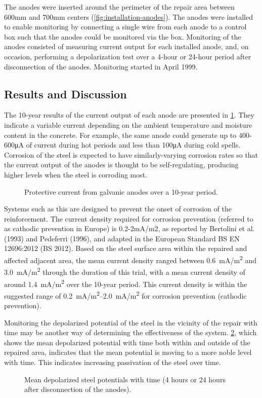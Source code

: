 The anodes were inserted around the perimeter of the repair area between 600mm and 700mm centers (\cref{fig:installation-anodes}). The anodes were installed to enable monitoring by connecting a single wire from each anode to a control box such that the anodes could be monitored via the box. Monitoring of the anodes consisted of measuring current output for each installed anode, and, on occasion, performing a depolarization test over a 4-hour or 24-hour period after disconnection of the anodes. Monitoring started in April 1999.


\subsection{Results and Discussion}
The 10-year results of the current output of each anode are presented in \cref{fig:protective-current}. They indicate a variable current depending on the ambient temperature and moisture content in the concrete. For example, the same anode could generate up to 400-600μA of current during hot periods and less than 100μA during cold spells. Corrosion of the steel is expected to have similarly-varying corrosion rates so that the current output of the anodes is thought to be self-regulating, producing higher levels when the steel is corroding most.

\begin{figure}
  \caption{Protective current from galvanic anodes over a 10-year period.}\label{fig:protective-current}
\end{figure}

Systems such as this are designed to prevent the onset of corrosion of the reinforcement. The current density required for corrosion prevention (referred to as cathodic prevention in Europe) is 0.2-2mA/m2, as reported by Bertolini et al. (1993) and Pedeferri (1996), and adapted in the European Standard BS EN 12696:2012 (BS 2012). Based on the steel surface area within the repaired and affected adjacent area, the mean current density ranged between \qty{0.6}{mA/m^2} and \qty{3.0}{mA/m^2} through the duration of this trial, with a mean current density of around \qty{1.4}{mA/m^2} over the 10-year period. This current density is within the suggested range of \qtyrange{0.2}{2.0}{mA/m^2} for corrosion prevention (cathodic prevention).

Monitoring the depolarized potential of the steel in the vicinity of the repair with time may be another way of determining the effectiveness of the system. \cref{fig:depolarize-potentials-with-time}, which shows the mean depolarized potential with time both within and outside of the repaired area, indicates that the mean potential is moving to a more noble level with time. This indicates increasing passivation of the steel over time.

\begin{figure}
  \caption{Mean depolarized steel potentials with time (4 hours or 24 hours after disconnection of the anodes).}\label{fig:depolarize-potentials-with-time}
\end{figure}